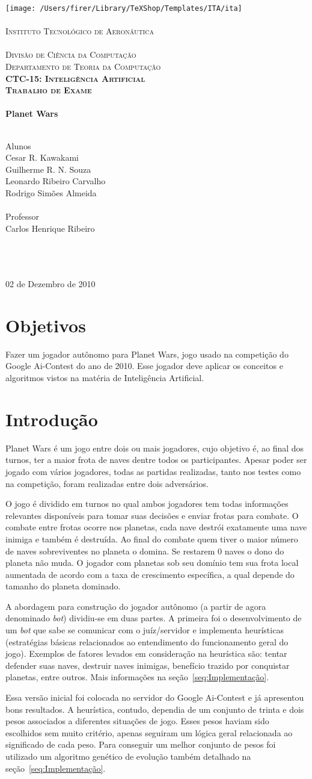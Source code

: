 \documentclass[a4paper,titlepage,11pt]{article}
\newcommand{\mydivision}{Divisão de Ciência da Computação\\Departamento de Teoria da Computação}
\newcommand{\mydiscipline}{CTC-15: Inteligência Artificial}
\newcommand{\mysupertitle}{Trabalho de Exame}
\newcommand{\mytitle}{Planet Wars}
\newcommand{\myname}{Cesar R. Kawakami\\Guilherme R. N. Souza\\Leonardo Ribeiro Carvalho\\Rodrigo Simões Almeida}
\newcommand{\myfieldAname}{Alunos}
\newcommand{\myfieldAcontent}{\myname}
\newcommand{\myfieldBname}{Professor}
\newcommand{\myfieldBcontent}{Carlos Henrique Ribeiro}
\newcommand{\myfieldCname}{\ }
\newcommand{\myfieldCcontent}{\ }
\newcommand{\mydate}{02 de Dezembro de 2010}
\renewcommand{\maketitle}{%
 	\begin{titlepage}
		\begin{center}
			\texttt{[image: /Users/firer/Library/TeXShop/Templates/ITA/ita]}\\
			\ \\ %
			\textsc{%
				\Large Instituto Tecnológico de Aeronáutica\\
				\large%
				\ \\
				\mydivision\\
				\textbf{\mydiscipline}\\
			}
			\vspace{2cm}
			\textbf{%
				\textsc{\large \mysupertitle}\\
				\ \\
				\huge \mytitle\\
				\ \\
			}
			\vspace{2cm}
			\begin{flushleft}
				\large \myfieldAname\\
				\Large \myfieldAcontent\\
				\ \\
				\large \myfieldBname\\
				\Large \myfieldBcontent\\
				\ \\
				\large \myfieldCname\\
				\Large \myfieldCcontent\\
			\end{flushleft}
			\vfill
			{\large \mydate}
		\end{center}		
	\end{titlepage}
}
\begin{document}
\maketitle

\section{Objetivos}

Fazer um jogador autônomo para Planet Wars, jogo usado na competição do Google Ai-Contest do ano de 2010. Esse jogador deve aplicar os conceitos e algoritmos vistos na matéria de Inteligência Artificial.

\section{Introdução}
Planet Wars é um jogo entre dois ou mais jogadores, cujo objetivo é, ao final dos turnos, ter a maior frota de naves dentre todos os participantes. Apesar poder ser jogado com vários jogadores, todas as partidas realizadas, tanto nos testes como na competição, foram realizadas entre dois adversários.

O jogo é dividido em turnos no qual ambos jogadores tem todas informações relevantes disponíveis para tomar suas decisões e enviar frotas para combate. O combate entre frotas ocorre nos planetas, cada nave destrói exatamente uma nave inimiga e também é destruída. Ao final do combate quem tiver o maior número de naves sobreviventes no planeta o domina. Se restarem 0 naves o dono do planeta não muda. O jogador com planetas sob seu domínio tem sua frota local aumentada de acordo com a taxa de crescimento específica, a qual depende do tamanho do planeta dominado.

A abordagem para construção do jogador autônomo (a partir de agora denominado {\em bot}) dividiu-se em duas partes. A primeira foi o desenvolvimento de um {\em bot} que sabe se comunicar com o juíz/servidor e implementa heurísticas (estratégias básicas relacionados ao entendimento do funcionamento geral do jogo). Exemplos de fatores levados em consideração na heurística são: tentar defender suas naves, destruir naves inimigas, benefício trazido por conquistar planetas, entre outros. Mais informações na seção~\ref{seq:Implementação}.

Essa versão inicial foi colocada no servidor do Google Ai-Contest e já apresentou bons resultados. A heurística, contudo, dependia de um conjunto de trinta e dois pesos associados a diferentes situações de jogo. Esses pesos haviam sido escolhidos sem muito critério, apenas seguiram um lógica geral relacionada ao significado de cada peso. Para conseguir um melhor conjunto de pesos foi utilizado um algoritmo genético de evolução também detalhado na seção~\ref{seq:Implementação}.
\end{document}
